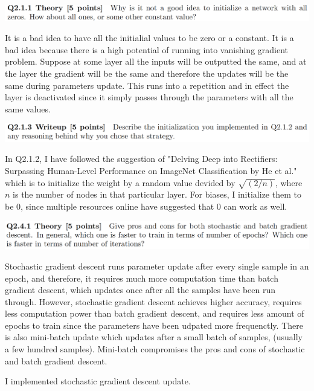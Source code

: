 \documentclass[12pt,letterpaper,boxed]{hmcpset}
\begin{document}
\begin{problem}[]
\includegraphics[width=\textwidth]{2_1_1.png}
\end{problem}

\begin{solution}
It is a bad idea to have all the initialial values to be zero or a constant. It is a bad idea because there is a high potential
of running into vanishing gradient problem. Suppose at some layer all the inputs will be outputted the same, and 
at the layer the gradient will be the same and therefore the updates will be the same during parameters update. This runs into a repetition and in effect the layer is deactivated since it simply passes through the parameters with 
all the same values.
\end{solution}

\begin{problem}[]
\includegraphics[width=\textwidth]{2_1_3.png}
\end{problem}

\begin{solution}
In Q2.1.2, I have followed the suggestion of "Delving Deep into Rectifiers: Surpassing Human-Level Performance on ImageNet Classification by He et al." which is to initialize the weight by a random value devided by $\sqrt{(2/n)}$, where $n$ is the number of nodes in that particular layer. For biases, I initialize them to be 0, since 
multiple resources online have suggested that 0 can work as well. 
\end{solution}

\begin{problem}[]
\includegraphics[width=\textwidth]{2_1_4.png}
\end{problem}

\begin{solution}
Stochastic gradient descent runs parameter update after every single sample in an epoch, and therefore, it requires
much more computation time than batch gradient descent, which updates once after all the samples have been run through. However, stochastic gradient descent achieves higher accuracy, requires less computation power than batch gradient descent, and requires less amount of epochs to train since the parameters have been udpated more frequenctly. There is also mini-batch update which updates after a small batch of samples, (usually a few hundred samples). Mini-batch compromises the pros and cons of stochastic and batch gradient descent. 

I implemented stochastic gradient descent update.
\end{solution}
\newpage
\end{document}
